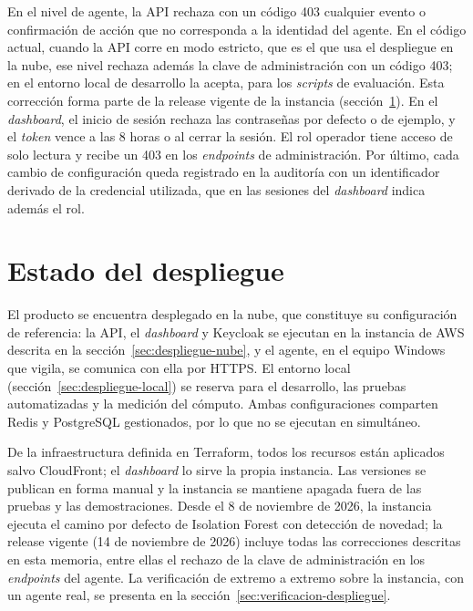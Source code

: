 En el nivel de agente, la API rechaza con un código 403 cualquier evento o confirmación de acción que no corresponda a la identidad del agente. En el código actual, cuando la API corre en modo estricto, que es el que usa el despliegue en la nube, ese nivel rechaza además la clave de administración con un código 403; en el entorno local de desarrollo la acepta, para los \emph{scripts} de evaluación. Esta corrección forma parte de la release vigente de la instancia (sección~\ref{sec:estado-despliegue}). En el \emph{dashboard}, el inicio de sesión rechaza las contraseñas por defecto o de ejemplo, y el \emph{token} vence a las 8 horas o al cerrar la sesión. El rol operador tiene acceso de solo lectura y recibe un 403 en los \emph{endpoints} de administración. Por último, cada cambio de configuración queda registrado en la auditoría con un identificador derivado de la credencial utilizada, que en las sesiones del \emph{dashboard} indica además el rol.

\section{Estado del despliegue}
\label{sec:estado-despliegue}
El producto se encuentra desplegado en la nube, que constituye su configuración de referencia: la API, el \emph{dashboard} y Keycloak se ejecutan en la instancia de AWS descrita en la sección~\ref{sec:despliegue-nube}, y el agente, en el equipo Windows que vigila, se comunica con ella por HTTPS. El entorno local (sección~\ref{sec:despliegue-local}) se reserva para el desarrollo, las pruebas automatizadas y la medición del cómputo. Ambas configuraciones comparten Redis y PostgreSQL gestionados, por lo que no se ejecutan en simultáneo.

De la infraestructura definida en Terraform, todos los recursos están aplicados salvo CloudFront; el \emph{dashboard} lo sirve la propia instancia. Las versiones se publican en forma manual y la instancia se mantiene apagada fuera de las pruebas y las demostraciones. Desde el 8 de noviembre de 2026, la instancia ejecuta el camino por defecto de Isolation Forest con detección de novedad; la release vigente (14 de noviembre de 2026) incluye todas las correcciones descritas en esta memoria, entre ellas el rechazo de la clave de administración en los \emph{endpoints} del agente. La verificación de extremo a extremo sobre la instancia, con un agente real, se presenta en la sección~\ref{sec:verificacion-despliegue}.

